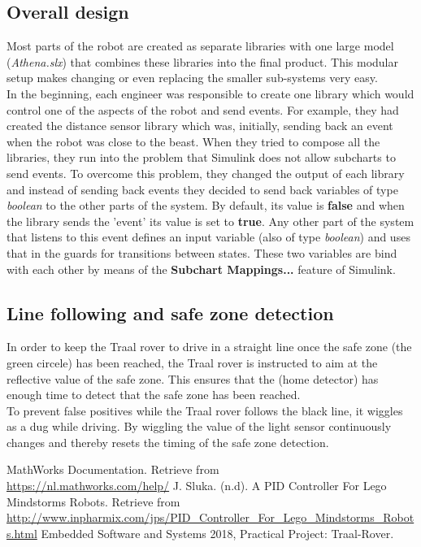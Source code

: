 \documentclass[a4paper,12pt]{article}
\begin{document}
\subsection{Overall design}
Most parts of the robot are created as separate libraries with one large model (\textit{Athena.slx}) that combines these libraries into the final product. This modular setup makes changing or even replacing the smaller sub-systems very easy.\\
In the beginning, each engineer was responsible to create one library which would control one of the aspects of the robot and send events. For example, they had created the distance sensor library which was, initially, sending back an event when the robot was close to the beast. When they tried to compose all the libraries, they run into the problem that Simulink does not allow subcharts to send events. To overcome this problem, they changed the output of each library and instead of sending back events they decided to send back variables of type \textit{boolean} to the other parts of the system. By default, its value is \textbf{false} and when the library sends the 'event' its value is set to \textbf{true}. Any other part of the system that listens to this event defines an input variable (also of type \textit{boolean}) and uses that in the guards for transitions between states. These two variables are bind with each other by means of the \textbf{Subchart Mappings...} feature of Simulink.
\subsection{Line following and safe zone detection}
In order to keep the Traal rover to drive in a straight line once the safe zone (the green circele) has been reached, the Traal rover is instructed to aim at the reflective value of the safe zone. This ensures that the (home detector) has enough time to detect that the safe zone has been reached.\\
To prevent false positives while the Traal rover follows the black line, it wiggles as a dug while driving. By wiggling the value of the light sensor continuously changes and thereby resets the timing of the safe zone detection.


\begin{thebibliography}{9}
 MathWorks Documentation. Retrieve from\\
\url{https://nl.mathworks.com/help/}
J. Sluka. (n.d). A PID Controller For Lego Mindstorms Robots. Retrieve from\\
\url{http://www.inpharmix.com/jps/PID_Controller_For_Lego_Mindstorms_Robots.html}
 Embedded Software and Systems 2018, Practical Project: Traal-Rover.
\end{thebibliography}
\end{document}
